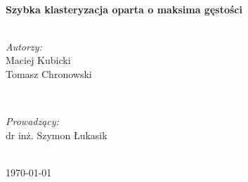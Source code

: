 \documentclass[a4paper,10pt,table]{article}
\begin{document}
\begin{titlepage}

\HRule \\[0.4cm]
{ \Large \bfseries 
Szybka	klasteryzacja oparta o	maksima	gęstości}\\[0.4cm] %
\HRule \\[1.5cm]
 

\begin{minipage}{0.4\textwidth}
\begin{flushleft} \large
\emph{Autorzy:}\\
Maciej Kubicki\\
Tomasz Chronowski\\
\end{flushleft}
\end{minipage}
~
\begin{minipage}{0.4\textwidth}
\begin{flushright} \large
\emph{Prowadzący:} \\
dr inż. Szymon Łukasik
\end{flushright}
\end{minipage}\\[4cm]



{\large \today}\\[3cm] %


 

\vfill %


\end{titlepage}
\newpage
\tableofcontents
\newpage
\end{document}
